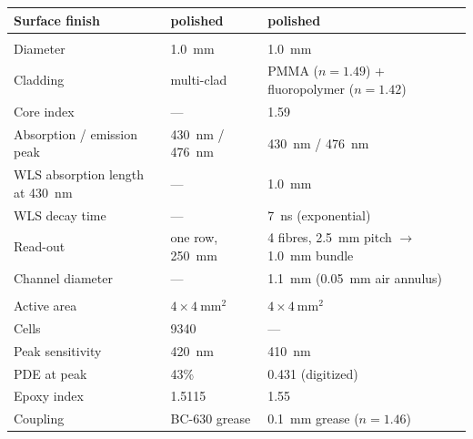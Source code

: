 \documentclass[preprint,12pt]{elsarticle}
\begin{document}
\begin{table}[t]
\begin{tabularx}{\textwidth}{@{}>{\raggedright\arraybackslash}p{} L L@{}}
Surface finish & polished & polished \\
\midrule
{}\\
Diameter & \SI{1.0}{\milli\meter} & \SI{1.0}{\milli\meter} \\
Cladding & multi-clad & PMMA ($n=1.49$) + fluoropolymer ($n=1.42$) \\
Core index & --- & 1.59 \\
Absorption / emission peak & \SI{430}{\nano\meter} / \SI{476}{\nano\meter} & \SI{430}{\nano\meter} / \SI{476}{\nano\meter} \\
WLS absorption length at \SI{430}{\nano\meter} & --- & \SI{1.0}{\milli\meter} \\
WLS decay time & --- & \SI{7}{\nano\second} (exponential) \\
Read-out & one row, \SI{250}{\milli\meter} & 4 fibres, \SI{2.5}{\milli\meter} pitch $\to$ \SI{1.0}{\milli\meter} bundle \\
Channel diameter & --- & \SI{1.1}{\milli\meter} (\SI{0.05}{\milli\meter} air annulus) \\
\midrule
{}\\
Active area & $4\times\SI{4}{\milli\meter\squared}$ & $4\times\SI{4}{\milli\meter\squared}$ \\
Cells & 9340 & --- \\
Peak sensitivity & \SI{420}{\nano\meter} & \SI{410}{\nano\meter} \\
PDE at peak & 43\% & 0.431 (digitized) \\
Epoxy index & 1.5115 & 1.55 \\
Coupling & BC-630 grease & \SI{0.1}{\milli\meter} grease ($n=1.46$) \\
\bottomrule
\end{tabularx}
\end{table}
\end{document}
